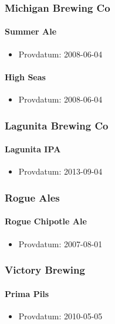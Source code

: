 \documentclass[11pt]{article}
\begin{document}
\subsubsection{Michigan Brewing Co}
\label{sec:orgb4495af}
\paragraph{Summer Ale}
\label{sec:org3686266}
\begin{itemize}
\item Provdatum: 2008-06-04
\end{itemize}
\paragraph{High Seas}
\label{sec:org3de67e3}
\begin{itemize}
\item Provdatum: 2008-06-04
\end{itemize}
\subsubsection{Lagunita Brewing Co}
\label{sec:orgfc031c1}
\paragraph{Lagunita IPA}
\label{sec:org4d13d65}
\begin{itemize}
\item Provdatum: 2013-09-04
\end{itemize}
\subsubsection{Rogue Ales}
\label{sec:org9cd2155}
\paragraph{Rogue Chipotle Ale}
\label{sec:org6b634ae}
\begin{itemize}
\item Provdatum: 2007-08-01
\end{itemize}
\subsubsection{Victory Brewing}
\label{sec:org9847b10}
\paragraph{Prima Pils}
\label{sec:org5f44757}
\begin{itemize}
\item Provdatum: 2010-05-05
\end{itemize}
\end{document}

